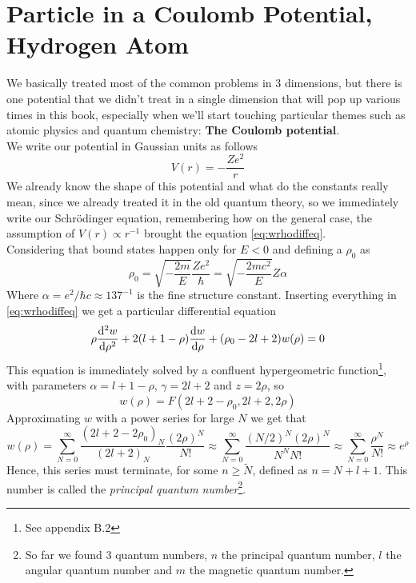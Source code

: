 \documentclass[../qm.tex]{subfiles}
\begin{document}
	\section{Particle in a Coulomb Potential, Hydrogen Atom}
	We basically treated most of the common problems in 3 dimensions, but there is one potential that we didn't treat in a single dimension that will pop up various times in this book, especially when we'll start touching particular themes such as atomic physics and quantum chemistry: \textbf{The Coulomb potential}.\\
	We write our potential in Gaussian units as follows
	\begin{equation}
		V(r)=-\frac{Ze^2}{r}
		\label{eq:coulpot}
	\end{equation}
	We already know the shape of this potential and what do the constants really mean, since we already treated it in the old quantum theory, so we immediately write our Schrödinger equation, remembering how on the general case, the assumption of $V(r)\propto r^{-1}$ brought the equation \eqref{eq:wrhodiffeq}.\\
	Considering that bound states happen only for $E<0$ and defining a $\rho_0$ as
	\begin{equation*}
		\rho_0=\sqrt{-\frac{2m}{E}}\frac{Ze^2}{\hbar}=\sqrt{-\frac{2mc^2}{E}}Z\alpha
	\end{equation*}
	Where $\alpha=e^2/\hbar c\approx137^{-1}$ is the fine structure constant. Inserting everything in \eqref{eq:wrhodiffeq} we get a particular differential equation
	\begin{equation}
		\rho\derivative[2]{w}{\rho}+2(l+1-\rho)\derivative{w}{\rho}+(\rho_0-2l+2)w(\rho)=0
		\label{eq:kummerequation}
	\end{equation}
	This equation is immediately solved by a confluent hypergeometric function\footnote{See appendix B.2}, with parameters $\alpha=l+1-\rho$, $\gamma=2l+2$ and $z=2\rho$, so
	\begin{equation}
		w(\rho)=F\left( 2l+2-\rho_0,2l+2,2\rho \right)
		\label{eq:wtochf}
	\end{equation}
	Approximating $w$ with a power series for large $N$ we get that
	\begin{equation*}
		w(\rho)=\sum_{N=0}^{\infty}\frac{\left( 2l+2-2\rho_0 \right)_N}{\left( 2l+2 \right)_N}\frac{(2\rho)^N}{N!}\approx\sum_{N=0}^{\infty}\frac{(N/2)^N(2\rho)^N}{N^NN!}\approx\sum_{N=0}^{\infty}\frac{\rho^N}{N!}\approx e^{\rho}
	\end{equation*}
	Hence, this series must terminate, for some $n\ge\tilde{N}$, defined as $n=N+l+1$. This number is called the \textit{principal quantum number}\footnote{So far we found 3 quantum numbers, $n$ the principal quantum number, $l$ the angular quantum number and $m$ the magnetic quantum number.}.\\
\end{document}
